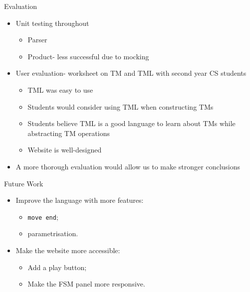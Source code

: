 \documentclass{beamer}
\begin{document}
    \begin{frame}{Evaluation}
        \begin{itemize}
            \item Unit testing throughout
            \begin{itemize}
                \item Parser
                \item Product- less successful due to mocking
            \end{itemize}
            \item User evaluation- worksheet on TM and TML with second year CS students
            \begin{itemize}
                \item TML was easy to use
                \item Students would consider using TML when constructing TMs
                \item Students believe TML is a good language to learn about TMs while abstracting TM operations
                \item Website is well-designed
            \end{itemize}
            \item A more thorough evaluation would allow us to make stronger conclusions
        \end{itemize}
    \end{frame}

    \begin{frame}{Future Work}
        \begin{itemize}
            \item Improve the language with more features:
            \begin{itemize}
                \item \texttt{move end};
                \item parametrisation.
            \end{itemize}
            \item Make the website more accessible:
            \begin{itemize}
                \item Add a play button;
                \item Make the FSM panel more responsive.
            \end{itemize}
        \end{itemize}
    \end{frame}
\end{document}
